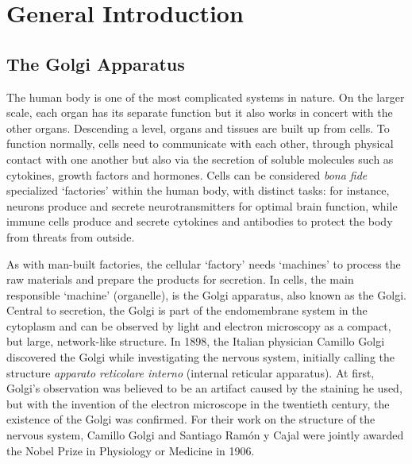 



\thispagestyle{empty}
\begin{savequote}

\end{savequote}
\chapter{General Introduction}
\stopthumb
\thispagestyle{empty}
\clearpage

\thispagestyle{fancy}
\continuethumb
\section{The Golgi Apparatus}
The human body is one of the most complicated systems in nature. On the larger scale, each organ has its separate function but it also works in concert with the other organs. Descending a level, organs and tissues are built up from cells. To function normally, cells need to communicate with each other, through physical contact with one another but also via the secretion of soluble molecules such as cytokines, growth factors and hormones. Cells can be considered \emph{bona fide} specialized ‘factories’ within the human body, with distinct tasks: for instance, neurons produce and secrete neurotransmitters for optimal brain function, while immune cells produce and secrete cytokines and antibodies to protect the body from threats from outside.

As with man-built factories, the cellular ‘factory’ needs ‘machines’ to process the raw materials and prepare the products for secretion. In cells, the main responsible ‘machine’ (organelle), is the Golgi apparatus, also known as the Golgi. Central to secretion, the Golgi is part of the endomembrane system in the cytoplasm and can be observed by light and electron microscopy as a compact, but large, network-like structure. In 1898, the Italian physician Camillo Golgi discovered the Golgi while investigating the nervous system, initially calling the structure \emph{apparato reticolare interno} (internal reticular apparatus)\cite{droscher_history_1998,fabene_1898-1998_1998}. At first, Golgi’s observation was believed to be an artifact caused by the staining he used, but with the invention of the electron microscope in the twentieth century, the existence of the Golgi was confirmed\cite{davidson_molecular_nodate}. For their work on the structure of the nervous system, Camillo Golgi and Santiago Ramón y Cajal were jointly awarded the Nobel Prize in Physiology or Medicine in 1906\cite{noauthor_nobel_nodate}.


